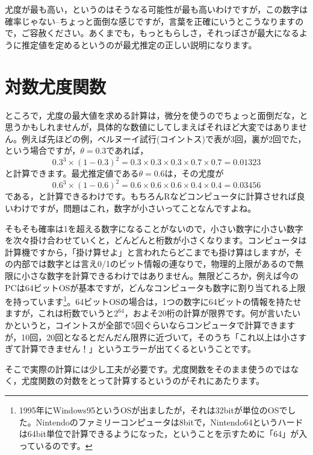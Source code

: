 \documentclass{ltjsarticle}
\begin{document}
尤度が最も高い，というのはそうなる可能性が最も高いわけですが，この数字は確率じゃない--ちょっと面倒な感じですが，言葉を正確にいうとこうなりますので，ご容赦ください。あくまでも，もっともらしさ，それっぽさが最大になるように推定値を定めるというのが最尤推定の正しい説明になります。
\section{対数尤度関数}
ところで，尤度の最大値を求める計算は，微分を使うのでちょっと面倒だな，と思うかもしれませんが，具体的な数値にしてしまえばそれほど大変ではありません。例えば先ほどの例，ベルヌーイ試行(コイントス)で表が3回，裏が2回でた，という場合ですが，$\theta=0.3$であれば，
\[ 0.3^3 \times (1-0.3)^2 = 0.3 \times 0.3 \times 0.3 \times 0.7 \times 0.7 = 0.01323 \]
と計算できます。最尤推定値である$\theta=0.6$は，その尤度が
\[ 0.6^3 \times (1-0.6)^2 = 0.6 \times 0.6 \times 0.6 \times 0.4 \times 0.4 = 0.03456 \]
である，と計算できるわけです。もちろんRなどコンピュータに計算させれば良いわけですが，問題はこれ，数字が小さいってことなんですよね。

そもそも確率は1を超える数字になることがないので，小さい数字に小さい数字を次々掛け合わせていくと，どんどんと桁数が小さくなります。コンピュータは計算機ですから，「掛け算せよ」と言われたらどこまでも掛け算はしますが，その内部では数字とは言え0/1のビット情報の連なりで，物理的上限があるので無限に小さな数字を計算できるわけではありません。無限どころか，例えば今のPCは64ビットOSが基本ですが，どんなコンピュータも数字に割り当てれる上限を持っています\footnote{1995年にWindows95というOSが出ましたが，それは32bitが単位のOSでした。Nintendoのファミリーコンピュータは8bitで，Nintendo64というハードは64bit単位で計算できるようになった，ということを示すために「64」が入っているのです。}。64ビットOSの場合は，1つの数字に64ビットの情報を持たせますが，これは桁数でいうと$2^{64}$，およそ20桁の計算が限界です。何が言いたいかというと，コイントスが全部で5回ぐらいならコンピュータで計算できますが，10回，20回となるとだんだん限界に近づいて，そのうち「これ以上は小さすぎて計算できません！」というエラーが出てくるということです。

そこで実際の計算には少し工夫が必要です。尤度関数をそのまま使うのではなく，尤度関数の対数をとって計算するというのがそれにあたります。
\end{document}
